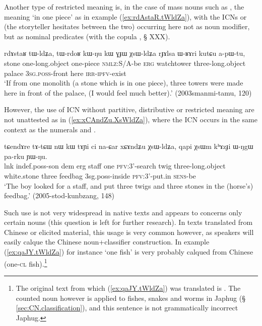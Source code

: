 Another type of restricted meaning is, in the case of mass nouns such as , the meaning `in one piece' as in example (\ref{ex:rdAstaR.tWldZa}), with the ICNs  or  (the storyteller hesitates between the two) occurring here not as noun modifier, but as nominal predicates (with the copula , § XXX).

\begin{exe}
\ex \label{ex:rdAstaR.tWldZa}
\gll rdɤstaʁ tɯ-ldʑa, tɯ-rdoʁ kɯ-ŋu kɯ ɣɟɯ χsɯ-ldʑa rɟɤlsa ɯ-ʁɤri kutɕu a-pɯ-tu, \\
stone one-long.object one-piece \textsc{nmlz}:S/A-be \textsc{erg} watchtower three-long.object palace \textsc{3sg}.\textsc{poss}-front here \textsc{irr}-\textsc{ipfv}-exist \\
\glt `If from one monolith (a stone which is in one piece), three  towers were made here in front of the palace, (I would feel much better).'  (2003smanmi-tamu, 120)
\end{exe} 

However, the use of ICN without partitive, distributive or restricted meaning are not unattested as in  (\ref{ex:xCAndZu.XsWldZa}), where the ICN  occurs in the same context as the numerals  and .

\begin{exe}
\ex \label{ex:xCAndZu.XsWldZa}
\gll tɕendɤre tɤ-tɕɯ nɯ kɯ tɤɲi ci na-ɕar xɕɤndʑu χsɯ-ldʑa, qapi χsɯm kʰɤzɟi ɯ-ŋgɯ pa-rku ɲɯ-ŋu. \\
lnk indef.poss-son dem erg staff one \textsc{pfv}:3'-search twig three-long.object white.stone three feedbag 3sg.poss-inside \textsc{pfv}:3'-put.in \textsc{sens}-be \\
\glt `The boy looked for a staff, and put three twigs and three stones in the (horse's) feedbag.' (2005-stod-kunbzang, 148)
\end{exe} 

Such use is not very widespread in native texts and appears to concerns only certain nouns (this question is left for further research). In texts translated from Chinese or elicited material, this usage is very common however, as speakers will easily calque the Chinese noun+classifier construction. In example (\ref{ex:qaJY.tWldZa}) for instance  `one fish' is very probably calqued from Chinese   (one-\textsc{cl} fish).\footnote{The original text from which (\ref{ex:qaJY.tWldZa}) was translated is . The counted noun  however is applied to fishes, snakes and worms in Japhug (§ \ref{sec:CN.classification}), and this sentence is not grammatically incorrect Japhug. } 

